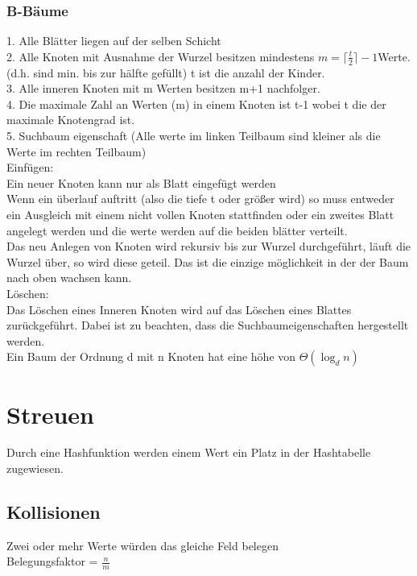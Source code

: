 \documentclass[a4paper]{scrartcl}
\begin{document}
\subsubsection{B-Bäume}
1. Alle Blätter liegen auf der selben Schicht\\
2. Alle Knoten mit Ausnahme der Wurzel besitzen mindestens $m = \lceil \frac{t}{2} \rceil - 1 $Werte. (d.h. sind min. bis zur hälfte gefüllt) t ist die anzahl der Kinder.\\ 
3. Alle inneren Knoten mit m Werten besitzen m+1 nachfolger.\\
4. Die maximale Zahl an Werten (m) in einem Knoten ist t-1 wobei t die der maximale Knotengrad ist.\\
5. Suchbaum eigenschaft (Alle werte im linken Teilbaum sind kleiner als die Werte im rechten Teilbaum)\\

Einfügen:\\
Ein neuer Knoten kann nur als Blatt eingefügt werden\\
Wenn ein überlauf auftritt (also die tiefe t oder größer wird) so muss entweder ein Ausgleich mit einem nicht vollen Knoten stattfinden oder ein zweites Blatt angelegt werden und die werte werden auf die beiden blätter verteilt.\\
Das neu Anlegen von Knoten wird rekursiv bis zur Wurzel durchgeführt, läuft die Wurzel über, so wird diese geteil. Das ist die einzige möglichkeit in der der Baum nach oben wachsen kann.\\

Löschen:\\
Das Löschen eines Inneren Knoten wird auf das Löschen eines Blattes zurückgeführt. Dabei ist zu beachten, dass die Suchbaumeigenschaften hergestellt werden.\\

Ein Baum der Ordnung d mit n Knoten hat eine höhe von $\Theta(\log_d n)$\\
\section{Streuen}

Durch eine Hashfunktion werden einem Wert ein Platz in der Hashtabelle zugewiesen.
\subsection{Kollisionen}
Zwei oder mehr Werte würden das gleiche Feld belegen\\
Belegungsfaktor = $\frac{n}{m}$\\
\end{document}
